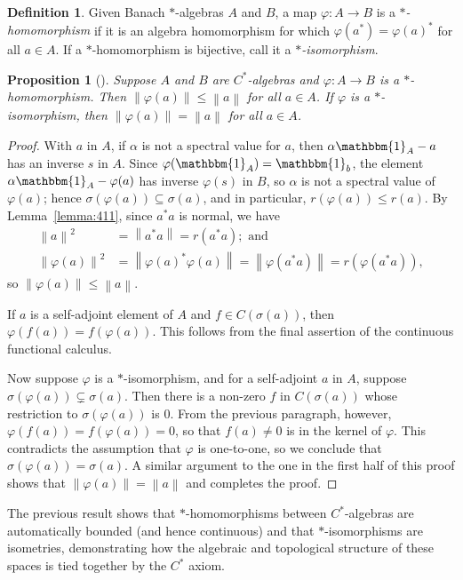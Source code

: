 \documentclass[11pt,a4paper]{report}
\theoremstyle{plain}
\newtheorem{prop}{Proposition}
\theoremstyle{definition}
\newtheorem*{defn}{Definition}
\newcommand{\1}{\mathbbm{1}}
\renewcommand{\phi}{\varphi}
\newcommand{\spec}[1]{\sigma(#1)}
\begin{document}
\begin{defn}
	Given Banach $\ast$-algebras $A$ and $B$, a map $\phi:A\to B$ is a 
	\emph{$\ast$-homomorphism} if it is an algebra homomorphism for which 
	$\phi(a^\ast) = \phi(a)^\ast$ for all $a \in A$. If a $\ast$-homomorphism is 
	bijective, call it a \emph{$\ast$-isomorphism}.
\end{defn}
\begin{prop}[{\cite[4.1.8]{kadison83}}] \label{prop:homo}
	Suppose $A$ and $B$ are $C^\ast$-algebras and $\phi:A\to B$ is a 
	$\ast$-homomorphism. Then $\left\|\phi(a)\right\| \leq \left\|a\right\|$ for all 
	$a \in A$. If $\phi$ is a $\ast$-isomorphism, then $\left\|\phi(a)\right\| = 
	\left\|a\right\|$ for all $a \in A$.


\end{prop}
\begin{proof}
	With $a$ in $A$, if $\alpha$ is not a spectral value for $a$, then $\alpha\1_A-a$ has 
	an inverse $s$ in $A$. Since $\phi(\1_A) =\1_b$, the element $\alpha \1_A-\phi(a)$ 
	has inverse $\phi(s)$ in $B$, so $\alpha$ is not a spectral value of $\phi(a)$; 
	hence $\spec {\phi(a)}\subseteq \spec a$, and in particular, $r(\phi(a))\leq 
	r(a)$. By Lemma~\ref{lemma:411}, since $a^\ast a$ is normal, we have 
	\begin{align*}
		\left\|a\right\|^2			
					&=	\left\|a^\ast a\right\|   = 	r(a^\ast a);  \mbox{ and }			\\
		\left\|\phi(a)\right\|^2 &=\left\|\phi(a)^\ast\phi(a)\right\| = 
							 \left\|\phi(a^\ast a)\right\| = r(\phi(a^\ast a)),
	\end{align*}
	so $\left\|\phi(a)\right\|\leq \left\|a\right\|$.
	
	If $a$ is a self-adjoint element of $A$ and $f \in C(\spec a)$, then 
	$\phi(f(a))=f(\phi(a))$. This follows from the final assertion of the continuous 
	functional calculus.

	
	Now suppose $\phi$ is a $\ast$-isomorphism, and for a self-adjoint $a$ in $A$, 
	suppose $\spec{\phi(a)} \subsetneq \spec a$. Then there is a non-zero $f$ in 
	$C(\spec a)$ whose restriction to $\spec{\phi(a)}$ is 0. From the previous 
	paragraph, however, $\phi(f(a)) = f(\phi(a))=0$, so that $f(a)\not= 0$ is in the 
	kernel of $\phi$. This contradicts the assumption that $\phi$ is one-to-one, 
	so we conclude that $\spec{\phi(a)} = \spec a$. A similar argument to the one 
	in the first half of this proof shows that $\left\|\phi(a)\right\| = 
	\left\|a\right\|$ and completes the proof.


\end{proof}
The previous result shows that $\ast$-homomorphisms between $C^\ast$-algebras are 
automatically bounded (and hence continuous) and that $\ast$-isomorphisms are 
isometries, demonstrating how the algebraic and topological structure of these 
spaces is tied together by the $C^\ast$ axiom.
\end{document}
